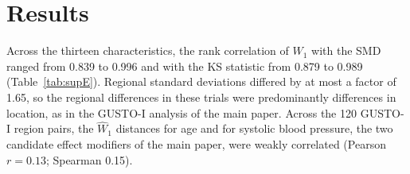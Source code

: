 \documentclass[11pt]{article}
\begin{document}
\section{Results}

\begin{table}[ht]
\centering
\caption{Agreement between $W_1$ and existing measures across all region pairs, by trial and characteristic. Spearman correlations are between the orderings of region pairs. The last three columns count pairs with SMD below 0.1 whose $\widehat{W}_1$ is or is not resolved against its null floor, and give the largest ratio of regional standard deviations among the pairs.}
\label{tab:supE}
\end{table}

Across the thirteen characteristics, the rank correlation of $W_1$ with the SMD ranged from 0.839 to 0.996 and with the KS statistic from 0.879 to 0.989 (Table~\ref{tab:supE}). Regional standard deviations differed by at most a factor of 1.65, so the regional differences in these trials were predominantly differences in location, as in the GUSTO-I analysis of the main paper. Across the 120 GUSTO-I region pairs, the $\widehat{W}_1$ distances for age and for systolic blood pressure, the two candidate effect modifiers of the main paper, were weakly correlated (Pearson $r = 0.13$; Spearman 0.15).
\end{document}
